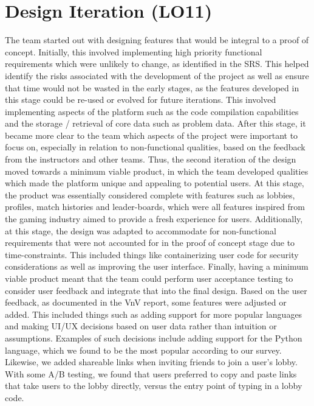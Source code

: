 \documentclass[12pt, titlepage]{article}
\begin{document}
\section{Design Iteration (LO11)}


The team started out with designing features that would be integral to a proof of concept. Initially, this involved implementing high priority functional requirements which were unlikely to change, as identified in the SRS. This helped identify the risks associated with the development of the project as well as ensure that time would not be wasted in the early stages, as the features developed in this stage could be re-used or evolved for future iterations. This involved implementing aspects of the platform such as the code compilation capabilities and the storage / retrieval of core data such as problem data. After this stage, it became more clear to the team which aspects of the project were important to focus on, especially in relation to non-functional qualities, based on the feedback from the instructors and other teams. Thus, the second iteration of the design moved towards a minimum viable product, in which the team developed qualities which made the platform unique and appealing to potential users. At this stage, the product was essentially considered complete with features such as lobbies, profiles, match histories and leader-boards, which were all features inspired from the gaming industry aimed to provide a fresh experience for users. Additionally, at this stage, the design was adapted to accommodate for non-functional requirements that were not accounted for in the proof of concept stage due to time-constraints. This included things like containerizing user code for security considerations as well as improving the user interface. Finally, having a minimum viable product meant that the team could perform user acceptance testing to consider user feedback and integrate that into the final design. Based on the user feedback, as documented in the VnV report, some features were adjusted or added. This included things such as adding support for more popular languages and making UI/UX decisions based on user data rather than intuition or assumptions. Examples of such decisions include adding support for the Python language, which we found to be the most popular according to our survey. Likewise, we added shareable links when inviting friends to join a user's lobby. With some A/B testing, we found that users preferred to copy and paste links that take users to the lobby directly, versus the entry point of typing in a lobby code.
\end{document}
